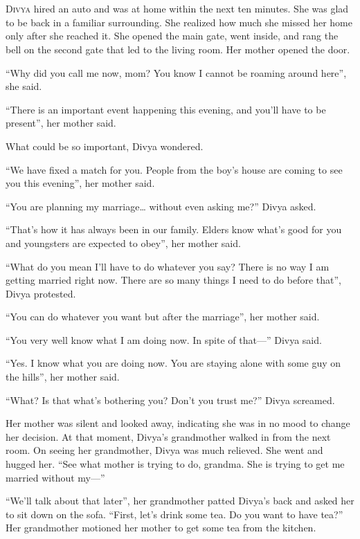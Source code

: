 \chapter{}

\lettrine{D}{ivya} hired an auto and was at home within the next ten minutes.
She was glad to be back in a familiar surrounding. She realized how much she
missed her home only after she reached it. She opened the main gate, went
inside, and rang the bell on the second gate that led to the living room. Her
mother opened the door.

“Why did you call me now, mom? You know I cannot be roaming around here”, she
said.

“There is an important event happening this evening, and you'll have to be
present”, her mother said.

What could be so important, Divya wondered.

“We have fixed a match for you. People from the boy's house are coming to see
you this evening”, her mother said.

“You are planning my marriage… without even asking me?” Divya asked.

“That's how it has always been in our family. Elders know what's good for you
and youngsters are expected to obey”, her mother said.

“What do you mean I'll have to do whatever you say? There is no way I am getting
married right now. There are so many things I need to do before that”, Divya
protested.

“You can do whatever you want but after the marriage”, her mother said.

“You very well know what I am doing now. In spite of that—” Divya said.

“Yes. I know what you are doing now. You are staying alone with some guy on the
hills”, her mother said.

“What? Is that what's bothering you? Don't you trust me?” Divya screamed.

Her mother was silent and looked away, indicating she was in no mood to change
her decision. At that moment, Divya's grandmother walked in from the next room.
On seeing her grandmother, Divya was much relieved. She went and hugged her. “See
what mother is trying to do, grandma. She is trying to get me married without
my—”

“We'll talk about that later”, her grandmother patted Divya's back and asked her
to sit down on the sofa. “First, let's drink some tea. Do you want to
have tea?” Her grandmother motioned her mother to get some tea from the kitchen.

